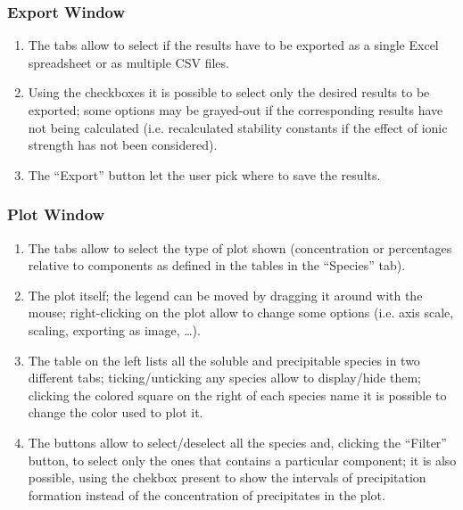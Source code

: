 \documentclass[a4paper, 12pt]{article}
\newcommand*\circled[1]{\kern-2.5em%
  \put(0,4){\color{red}\circle*{18}}\put(0,4){\circle{16}}%
  \put(-4,0){\color{white}\bfseries\large#1}~~}
\begin{document}
\subsubsection{Export Window}
\begin{enumerate}[label=\protect\circled{\arabic*}]
    \item The tabs allow to select if the results have to be exported as a single Excel spreadsheet or as multiple CSV files.
    \item Using the checkboxes it is possible to select only the desired results to be exported; some options may be grayed-out if the corresponding results have not being calculated (i.e. recalculated stability constants if the effect of ionic strength has not been considered).
    \item The ``Export'' button let the user pick where to save the results.
\end{enumerate}

\subsubsection{Plot Window}
\begin{enumerate}[label=\protect\circled{\arabic*}]
    \item The tabs allow to select the type of plot shown (concentration or percentages relative to components as defined in the tables in the ``Species'' tab).
    \item The plot itself; the legend can be moved by dragging it around with the mouse; right-clicking on the plot allow to change some options (i.e. axis scale, scaling, exporting as image, \ldots).
    \item The table on the left lists all the soluble and precipitable species in two different tabs; ticking/unticking any species allow to display/hide them; clicking the colored square on the right of each species name it is possible to change the color used to plot it.
    \item The buttons allow to select/deselect all the species and, clicking the ``Filter'' button, to select only the ones that contains a particular component; it is also possible, using the chekbox present to show the intervals of precipitation formation instead of the concentration of precipitates in the plot.
\end{enumerate}
\end{document}
